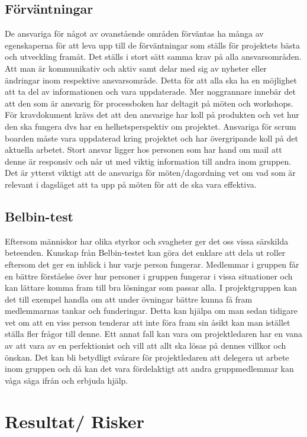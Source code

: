 \documentclass[12pt]{article}
\begin{document}
\subsection{Förväntningar}

De ansvariga för något av ovanstående områden förväntas ha många av egenskaperna för att
leva upp till de förväntningar som ställs för projektets bästa och utveckling framåt. Det ställs i
stort sätt samma krav på alla ansvarsområden. Att man är kommunikativ och aktiv samt delar
med sig av nyheter eller ändringar inom respektive ansvarsområde. Detta för att alla ska ha en
möjlighet att ta del av informationen och vara uppdaterade. Mer noggrannare innebär det att
den som är ansvarig för processboken har deltagit på möten och workshops. För
kravdokument krävs det att den ansvarige har koll på produkten och vet hur den ska fungera
dvs har en helhetsperspektiv om projektet. Ansvariga för scrum boarden måste vara
uppdaterad kring projektet och har övergripande koll på det aktuella arbetet. Stort ansvar
ligger hos personen som har hand om mail att denne är responsiv och når ut med viktig
information till andra inom gruppen. Det är ytterst viktigt att de ansvariga för
möten/dagordning vet om vad som är relevant i dagsläget att ta upp på möten för att de ska
vara effektiva.

\subsection{Belbin-test}

Eftersom människor har olika styrkor och svagheter ger det oss vissa särskilda beteenden.
Kunskap från Belbin-testet kan göra det enklare att dela ut roller eftersom det ger en inblick i
hur varje person fungerar. Medlemmar i gruppen får en bättre förståelse över hur personer i
gruppen fungerar i vissa situationer och kan lättare komma fram till bra lösningar som passar
alla. I projektgruppen kan det till exempel handla om att under övningar bättre kunna få fram
medlemmarnas tankar och funderingar. Detta kan hjälpa om man sedan tidigare vet om att en
viss person tenderar att inte föra fram sin åsikt kan man istället ställa fler frågor till denne. Ett
annat fall kan vara om projektledaren har en vana av att vara av en perfektionist och vill att
allt ska lösas på dennes villkor och önskan. Det kan bli betydligt svårare för projektledaren att
delegera ut arbete inom gruppen och då kan det vara fördelaktigt att andra gruppmedlemmar
kan våga säga ifrån och erbjuda hjälp.
\section{Resultat/ Risker}
\end{document}

